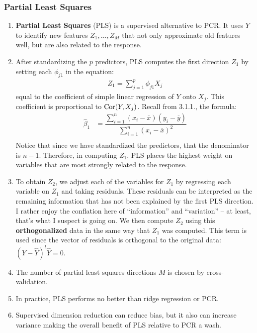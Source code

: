\documentclass[10pt]{article}
\newcommand{\Cor}{{\rm Cor}}
\begin{document}
\subsubsection{Partial Least Squares} 
\begin{enumerate}
	\item \textbf{Partial Least Squares} (PLS) is a supervised alternative to PCR.  It uses $Y$ to identify new features $Z_1, \dots, Z_M$ that not only approximate old features well, but are also related to the response.
	\item After standardizing the $p$ predictors, PLS computes the first direction $Z_1$ by setting each $\phi_{j1}$ in the equation: 
	\begin{align*}
		Z_1 = \sum_{j = 1}^p \phi_{j1} X_j
	\end{align*}
	equal to the coefficient of simple linear regression of $Y$ onto $X_j$.  This coefficient is proportional to $\Cor(Y, X_j)$. 
	{\color{brown} Recall from 3.1.1., the formula: 
	\begin{align*}
		\hat\beta_1 &= \dfrac{ \sum_{i = 1}^n (x_i - \overline{x} )(y_i - \overline{y})}{\sum_{i = 1}^n (x_i - \overline{x} )^2} \\
	\end{align*}
	Notice that since we have standardized the predictors, that the denominator is $n-1$.}
	Therefore, in computing $Z_1$, PLS places the highest weight on variables that are most strongly related to the response.
	\item To obtain $Z_2$, we adjust each of the variables for $Z_1$ by regressing each variable on $Z_1$ and taking residuals.  These residuals can be interpreted as the remaining information that has not been explained by the first PLS direction.  {\color{brown}  I rather enjoy the conflation here of ``information'' and ``variation'' -- at least, that's what I suspect is going on.}  We then compute $Z_2$ using this \textbf{orthogonalized} data in the same way that $Z_1$ was computed.  This term is used since the vector of residuals is orthogonal to the original data: $(Y - \hat Y)^t \hat Y= 0 $.
	\item The number of partial least squares directions $M$ is chosen by cross-validation.
	\item In practice, PLS performs no better than ridge regression or PCR.  
	\item Supervised dimension reduction can reduce bias, but it also can increase variance making the overall benefit of PLS relative to PCR a wash.
\end{enumerate}
\end{document}
